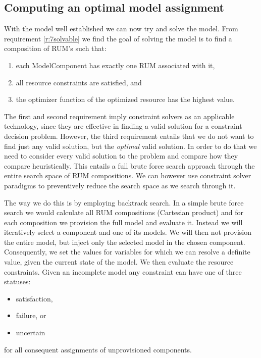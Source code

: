\subsection{Computing an optimal model assignment}
With the model well established we can now try and solve the model. From requirement \ref{r:7solvable} we find the goal of solving the model is to find a composition of RUM's such that:
\begin{enumerate}
\nospace
\item each ModelComponent has exactly one RUM associated with it,
\item all resource constraints are satisfied, and
\item the optimizer function of the optimized resource has the highest value.
\end{enumerate}
The first and second requirement imply constraint solvers as an applicable technology, since they are effective in finding a valid solution for a constraint decision problem. However, the third requirement entails that we do not want to find just any valid solution, but the \emph{optimal} valid solution. In order to do that we need to consider every valid solution to the problem and compare how they compare heuristically. This entails a full brute force search approach through the entire search space of RUM compositions. We can however use constraint solver paradigms to preventively reduce the search space as we search through it.

The way we do this is by employing backtrack search. In a simple brute force search we would calculate all RUM compositions (Cartesian product) and for each composition we provision the full model and evaluate it. Instead we will iteratively select a component and one of its models. We will then not provision the entire model, but inject only the selected model in the chosen component. Consequently, we set the values for variables for which we can resolve a definite value, given the current state of the model. We then evaluate the resource constraints. Given an incomplete model any constraint can have one of three statuses:
\begin{itemize}
\nospace
\item satisfaction,
\item failure, or
\item uncertain
\end{itemize}
for all consequent assignments of unprovisioned components.

